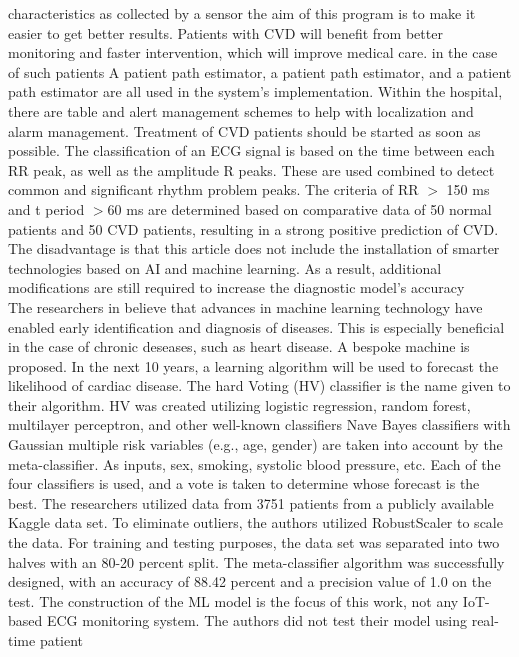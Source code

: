 \documentclass{bmcart}
\begin{document}
characteristics as collected by a sensor the aim of this program is to make it
easier to get better results. Patients with CVD will benefit from better
monitoring and faster intervention, which will improve medical care. in the case
of such patients A patient path estimator, a patient path estimator, and a
patient path estimator are all used in the system's implementation.  Within the
hospital, there are table and alert management schemes to help with localization
and alarm management. Treatment of CVD patients should be started as soon as
possible. The classification of an ECG signal is based on the time between each
RR peak, as well as the amplitude R peaks. These are used combined to detect
common and significant rhythm problem peaks. The criteria of RR $>$ 150 ms and t
period $>$60 ms are determined based on comparative data of 50 normal patients
and 50 CVD patients, resulting in a strong positive prediction of CVD. The
disadvantage is that this article does not include the installation of smarter
technologies based on AI and machine learning. As a result, additional
modifications are still required to increase the diagnostic model's accuracy\\
The researchers in \cite{9350514} believe that advances in machine learning
technology have enabled early identification and diagnosis of diseases. This is
especially beneficial in the case of chronic deseases, such as heart disease. A
bespoke machine is proposed. In the next 10 years, a learning algorithm will be
used to forecast the likelihood of cardiac disease. The hard Voting (HV)
classifier is the name given to their algorithm. HV was created utilizing
logistic regression, random forest, multilayer perceptron, and other well-known
classifiers  Nave Bayes classifiers with Gaussian multiple risk variables (e.g.,
age, gender) are taken into account by the meta-classifier. As inputs, sex,
smoking, systolic blood pressure, etc. Each of the four classifiers is used, and
a vote is taken to determine whose forecast is the best. The researchers
utilized data from 3751 patients from a publicly available Kaggle data set. To
eliminate outliers, the authors utilized RobustScaler to scale the data. For
training and testing purposes, the data set was separated into two halves with
an 80-20 percent split. The meta-classifier algorithm was successfully designed,
with an accuracy of 88.42 percent and a precision value of 1.0 on the test. The
construction of the ML model is the focus of this work, not any IoT-based ECG
monitoring system. The authors did not test their model using real-time patient
\end{document}
